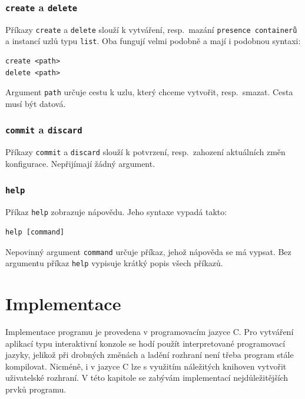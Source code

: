 \documentclass[thesis=B,czech,hidelinks]{FITthesis}[2019/03/06]
\newcommand{\Rplus}{\protect\hspace{-.1em}\protect\raisebox{.35ex}{\smaller{\smaller\textbf{+}}}}
\newcommand{\Cpp}{\mbox{C\Rplus\Rplus}\xspace}
\begin{document}
\subsection{\texttt{create} a \texttt{delete}}
Příkazy \texttt{create} a \texttt{delete} slouží k vytváření, resp.\ mazání \texttt{presence containerů} a instancí uzlů typu \texttt{list}. Oba fungují velmi podobně a mají i podobnou syntaxi:
\begin{verbatim}
create <path>
delete <path>
\end{verbatim}
Argument \texttt{path} určuje cestu k uzlu, který chceme vytvořit, resp.\ smazat. Cesta musí být datová.
\subsection{\texttt{commit} a \texttt{discard}}
Příkazy \texttt{commit} a \texttt{discard} slouží k potvrzení, resp.\ zahození aktuálních změn konfigurace. Nepřijímají žádný argument.
\subsection{\texttt{help}}
Příkaz \texttt{help} zobrazuje nápovědu. Jeho syntaxe vypadá takto:
\begin{verbatim}
help [command]
\end{verbatim}
Nepovinný argument \texttt{command} určuje příkaz, jehož nápověda se má vypsat. Bez argumentu příkaz \texttt{help} vypisuje krátký popis všech příkazů.


\chapter{Implementace}
Implementace programu je provedena v programovacím jazyce \Cpp{}. Pro vytváření aplikací typu interaktivní konzole se hodí použít interpretované programovací jazyky, jelikož při drobných změnách a ladění rozhraní není třeba program stále kompilovat. Nicméně, i v jazyce \Cpp{} lze s využitím náležitých knihoven vytvořit uživatelské rozhraní. V této kapitole se zabývám implementací nejdůležitějších prvků programu.
\end{document}
